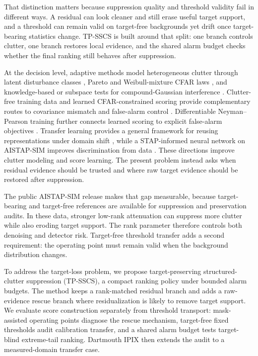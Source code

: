 \documentclass[journal]{IEEEtran}
\begin{document}
That distinction matters because suppression quality and threshold validity fail in different ways. A residual can look cleaner and still erase useful target support, and a threshold can remain valid on target-free backgrounds yet drift once target-bearing statistics change. TP-SSCS is built around that split: one branch controls clutter, one branch restores local evidence, and the shared alarm budget checks whether the final ranking still behaves after suppression.

At the decision level, adaptive methods model heterogeneous clutter through latent disturbance classes \cite{coluccia2024adaptive}, Pareto and Weibull-mixture CFAR laws \cite{weinberg2013pareto,vancao2014weibull}, and knowledge-based or subspace tests for compound-Gaussian interference \cite{xue2019knowledge,jiang2023subspace}. Clutter-free training data and learned CFAR-constrained scoring provide complementary routes to covariance mismatch and false-alarm control \cite{rong2022clutterfree,diskin2024cfarnet}. Differentiable Neyman--Pearson training further connects learned scoring to explicit false-alarm objectives \cite{qu2025np}. Transfer learning provides a general framework for reusing representations under domain shift \cite{pan2010transfer}, while a STAP-informed neural network on AISTAP-SIM improves discrimination from data \cite{vega2024aistap}. These directions improve clutter modeling and score learning. The present problem instead asks when residual evidence should be trusted and where raw target evidence should be restored after suppression.

The public AISTAP-SIM release makes that gap measurable, because target-bearing and target-free references are available for suppression and preservation audits. In these data, stronger low-rank attenuation can suppress more clutter while also eroding target support. The rank parameter therefore controls both denoising and detector risk. Target-free threshold transfer adds a second requirement: the operating point must remain valid when the background distribution changes.

To address the target-loss problem, we propose target-preserving structured-clutter suppression (TP-SSCS), a compact ranking policy under bounded alarm budgets. The method keeps a rank-matched residual branch and adds a raw-evidence rescue branch where residualization is likely to remove target support. We evaluate score construction separately from threshold transport: mask-assisted operating points diagnose the rescue mechanism, target-free fixed thresholds audit calibration transfer, and a shared alarm budget tests target-blind extreme-tail ranking. Dartmouth IPIX then extends the audit to a measured-domain transfer case.
\end{document}
